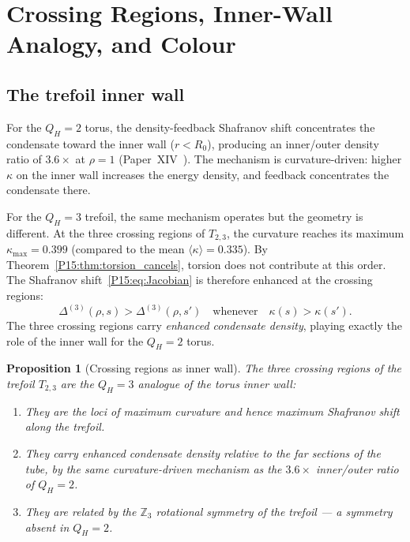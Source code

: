 \documentclass[11pt,a4paper]{article}
\newtheorem{proposition}[theorem]{Proposition}
\theoremstyle{definition}\newtheorem{definition}[theorem]{Definition}
\theoremstyle{remark}
\newcommand{\QH}{Q_H}
\begin{document}
\section{Crossing Regions, Inner-Wall Analogy, and Colour}
\label{P15:sec:crossings}

\subsection{The trefoil inner wall}

For the $\QH=2$ torus, the density-feedback Shafranov shift
concentrates the condensate toward the inner wall ($r<R_0$),
producing an inner/outer density ratio of $3.6\times$ at $\rho=1$
(Paper~XIV~\cite{Paper14}).
The mechanism is curvature-driven: higher $\kappa$ on the inner wall
increases the energy density, and feedback concentrates the
condensate there.

For the $\QH=3$ trefoil, the same mechanism operates but the
geometry is different.
At the three crossing regions of $T_{2,3}$, the curvature reaches
its maximum $\kappa_{\max}=0.399$ (compared to the mean $\langle\kappa\rangle=0.335$).
By Theorem~\ref{P15:thm:torsion_cancels}, torsion does not contribute
at this order.
The Shafranov shift~\eqref{P15:eq:Jacobian} is therefore enhanced
at the crossing regions:
\begin{equation}
  \Delta^{(3)}(\rho,s) > \Delta^{(3)}(\rho,s')
  \quad\text{whenever}\quad \kappa(s) > \kappa(s').
  \label{P15:eq:crossing_shift}
\end{equation}
The three crossing regions carry \emph{enhanced condensate density},
playing exactly the role of the inner wall for the $\QH=2$ torus.

\begin{proposition}[Crossing regions as inner wall]
\label{P15:prop:crossings}
The three crossing regions of the trefoil $T_{2,3}$ are the
$\QH=3$ analogue of the torus inner wall:
\begin{enumerate}[noitemsep,label=(\roman*)]
\item They are the loci of maximum curvature and hence maximum
  Shafranov shift along the trefoil.
\item They carry enhanced condensate density relative to the
  far sections of the tube, by the same curvature-driven mechanism
  as the $3.6\times$ inner/outer ratio of $\QH=2$.
\item They are related by the $\mathbb{Z}_3$ rotational symmetry
  of the trefoil --- a symmetry absent in $\QH=2$.
\end{enumerate}
\end{proposition}
\end{document}
